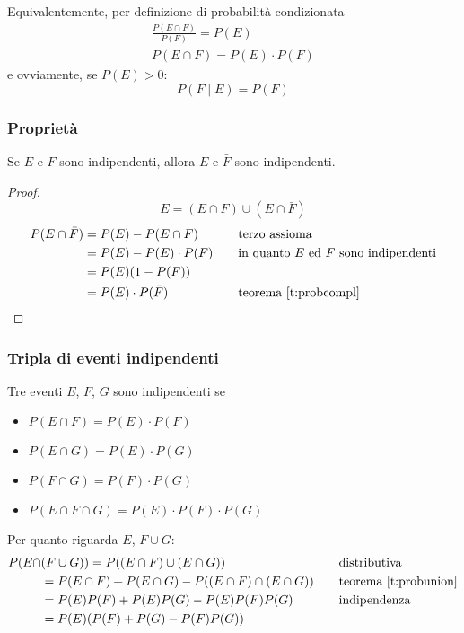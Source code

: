 Equivalentemente, per definizione di probabilità condizionata
\begin{gather*}
	\frac{P(E \cap F)}{P(F)}=P(E) \\[1ex]
	P(E \cap F)=P(E)\cdot P(F)
\end{gather*}
e ovviamente, se $P(E)>0$:
\begin{equation*}
	P(F \mid E)=P(F)
\end{equation*}

\subsubsection{Proprietà}
\begin{teor}
	Se $E$ e $F$ sono indipendenti, allora $E$ e $\bar F$ sono indipendenti.
\end{teor}
\begin{proof}
	\begin{equation*}
		E = (E\cap F) \cup (E \cap \bar F)
	\end{equation*}
	\begin{align*}
		P(E \cap \bar F) & = P(E) - P(E \cap F)    & \quad & \text{terzo assioma}                          \\
		                 & = P(E) - P(E)\cdot P(F) & \quad & \text{in quanto $E$ ed $F$ sono indipendenti} \\
		                 & = P(E)(1-P(F))                                                      \\
		                 & = P(E)\cdot P(\bar F)   & \quad & \text{teorema \ref{t:probcompl}} \qedhere
	\end{align*}
\end{proof}

\subsubsection{Tripla di eventi indipendenti}
\begin{defin}
	Tre eventi $E$, $F$, $G$ sono indipendenti se
	\begin{itemize}
		\item $P(E \cap F)=P(E)\cdot P(F)$
		\item $P(E \cap G)=P(E)\cdot P(G)$
		\item $P(F \cap G)=P(F)\cdot P(G)$
		\item $P(E \cap F \cap G)=P(E)\cdot P(F)\cdot P(G)$
	\end{itemize}
\end{defin}

\noindent
Per quanto riguarda $E$, $F\cup G$:
\begin{align*}
	P(E \cap & (F\cup G))  = P((E\cap F)\cup (E\cap G))                & \quad & \text{distributiva}              \\
	         & = P(E \cap F) + P(E\cap G) - P((E\cap F)\cap (E\cap G)) & \quad & \text{teorema \ref{t:probunion}} \\
	         & = P(E)P(F) + P(E)P(G) - P(E)P(F)P(G)                    & \quad & \text{indipendenza}              \\
	         & = P(E)(P(F) + P(G)-P(F)P(G))
\end{align*}

